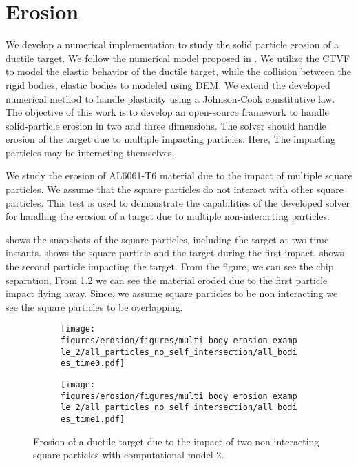\chapter{Erosion}
\label{chap:erosion}
We develop a numerical implementation to study the solid particle erosion of a
ductile target. We follow the numerical model proposed in
\citep{dong2016smoothed}. We utilize the CTVF to model the elastic behavior of
the ductile target, while the collision between the rigid bodies, elastic bodies
to modeled using DEM. We extend the developed numerical method to handle
plasticity using a Johnson-Cook constitutive law. The objective of this work is
to develop an open-source framework to handle solid-particle erosion in two and
three dimensions. The solver should handle erosion of the target due to multiple
impacting particles. Here, The impacting particles may be interacting
themselves.


We study the erosion of AL6061-T6 material due to the impact of multiple square
particles. We assume that the square particles do not interact with other square
particles. This test is used to demonstrate the capabilities of the developed
solver for handling the erosion of a target due to multiple non-interacting
particles.

 shows the snapshots of the square particles, including the
target at two time instants.  shows the square particle
and the target during the first impact.  shows the second
particle impacting the target. From the figure, we can see the chip separation.
From \cref{fig:mpe-2-full-b} we can see the material eroded due to the first
particle impact flying away. Since, we assume square particles to be non interacting
we see the square particles to be overlapping.
\begin{figure}[tpb]
  \centering
  \begin{subfigure}{0.48\textwidth}
    \centering
    \texttt{[image: figures/erosion/figures/multi\_body\_erosion\_example\_2/all\_particles\_no\_self\_intersection/all\_bodies\_time0.pdf]}
    \subcaption{}
    \label{fig:mpe-2-full-a}
  \end{subfigure}
  \begin{subfigure}{0.48\textwidth}
    \centering
    \texttt{[image: figures/erosion/figures/multi\_body\_erosion\_example\_2/all\_particles\_no\_self\_intersection/all\_bodies\_time1.pdf]}
    \subcaption{}
    \label{fig:mpe-2-full-b}
  \end{subfigure}
  \caption{Erosion of a ductile target due to the impact of two non-interacting
    square particles with computational model 2.}
\label{fig:mpe-2-full}
\end{figure}



